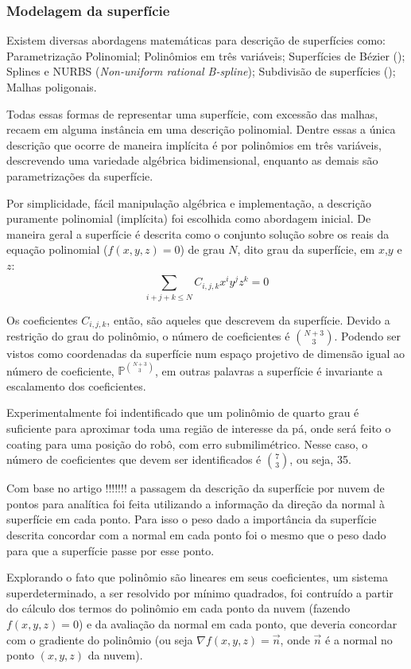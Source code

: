 \subsubsection{Modelagem da superfície}\label{modelagem}

Existem diversas abordagens matemáticas para descrição de superfícies como:
Parametrização Polinomial; Polinômios em três variáveis; Superfícies de
Bézier (\cite{farin2002curves}); Splines e NURBS (\textit{Non-uniform rational
B-spline}); Subdivisão de superfícies (\cite{peters2008subdivision}); Malhas
poligonais.

Todas essas formas de representar uma superfície, com excessão das malhas,
recaem em alguma instância em uma descrição polinomial. Dentre essas a única
descrição que ocorre de maneira implícita é por polinômios em três variáveis,
descrevendo uma variedade algébrica bidimensional, enquanto as demais são
parametrizações da superfície. 

Por simplicidade, fácil manipulação algébrica e implementação, a descrição
puramente polinomial (implícita) foi escolhida como abordagem inicial. De
maneira geral a superfície é descrita como o conjunto solução sobre os
reais da equação polinomial ($f(x,y,z)=0$) de grau $N$, dito grau da
superfície, em $x$,$y$ e $z$:
\[\sum\limits_{i+j+k \leq N}^{} C_{i,j,k}x^iy^jz^k = 0\]

Os coeficientes $C_{i,j,k}$, então, são aqueles que descrevem da superfície.
Devido a restrição do grau do polinômio, o número de coeficientes é
$\binom{N+3}{3}$. Podendo ser vistos como coordenadas da superfície num espaço
projetivo de dimensão igual ao número de coeficiente,
$\mathbb{P}^{\binom{N+3}{3}}$, em outras palavras a superfície é invariante a
escalamento dos coeficientes.

Experimentalmente foi indentificado que um polinômio de quarto grau é suficiente
para aproximar toda uma região de interesse da pá, onde será feito o coating
para uma posição do robô, com erro submilimétrico. Nesse caso, o número de
coeficientes que devem ser identificados é $\binom{7}{3}$, ou seja, 35.

Com base no artigo !!!!!!! a passagem da descrição da superfície por nuvem de
pontos para analítica foi feita utilizando a informação da direção da normal à
superfície em cada ponto. Para isso o peso dado a importância da superfície
descrita concordar com a normal em cada ponto foi o mesmo que o peso dado para
que a superfície passe por esse ponto.

Explorando o fato que polinômio são lineares em seus coeficientes, um sistema
superdeterminado, a ser resolvido por mínimo quadrados, foi contruído a partir
do cálculo dos termos do polinômio em cada ponto da nuvem (fazendo $f(x,y,z)=0$)
e da avaliação da normal em cada ponto, que deveria concordar com o gradiente do
polinômio (ou seja $\nabla f(x,y,z) = \overrightarrow{n}$, onde
$\overrightarrow{n}$ é a normal no ponto $(x,y,z)$ da nuvem).



% 
